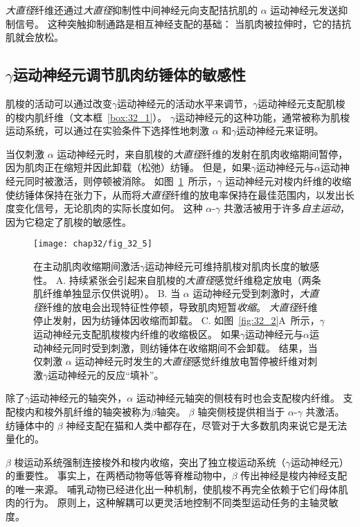 \textit{大直径}纤维还通过\textit{大直径}抑制性中间神经元向支配拮抗肌的 $ \alpha $ 运动神经元发送抑制信号。
这种突触抑制通路是相互神经支配的基础：
当肌肉被拉伸时，它的拮抗肌就会放松。



\subsection{$ \gamma $运动神经元调节肌肉纺锤体的敏感性}

肌梭的活动可以通过改变$ \gamma $运动神经元的活动水平来调节，$ \gamma $运动神经元支配肌梭的梭内肌纤维（文本框~\ref{box:32_1}）。
$ \gamma $运动神经元的这种功能，通常被称为肌梭运动系统，可以通过在实验条件下选择性地刺激 $ \alpha $ 和$ \gamma $运动神经元来证明。


当仅刺激 $ \alpha $ 运动神经元时，来自肌梭的\textit{大直径}纤维的发射在肌肉收缩期间暂停，因为肌肉正在缩短并因此卸载（松弛）纺锤。
但是，如果$ \gamma $运动神经元与$ \alpha $运动神经元同时被激活，则停顿被消除。
如图~\ref{fig:32_5}~所示，$ \gamma $ 运动神经元对梭内纤维的收缩使纺锤体保持在张力下，从而将\textit{大直径}纤维的放电率保持在最佳范围内，以发出长度变化信号，无论肌肉的实际长度如何。
这种 $ \alpha $-$ \gamma $ 共激活被用于许多\textit{自主运动}，因为它稳定了肌梭的敏感性。


\begin{figure}[htbp]
	\centering
	\texttt{[image: chap32/fig\_32\_5]}
	\caption{在主动肌肉收缩期间激活$ \gamma $运动神经元可维持肌梭对肌肉长度的敏感性\cite{hunt1951stretch}。
	A. 持续紧张会引起来自肌梭的\textit{大直径}感觉纤维稳定放电（两条肌纤维单独显示仅供说明）。
	B. 当 $ \alpha $ 运动神经元受到刺激时，\textit{大直径}纤维的放电会出现特征性停顿，导致肌肉短暂\textit{收缩}。
	\textit{大直径}纤维停止发射，因为纺锤体因收缩而卸载。
	C. 如图~\ref{fig:32_2}A~所示，$ \gamma $运动神经元支配肌梭梭内纤维的收缩极区。
	如果$ \gamma $运动神经元与$ \alpha $运动神经元同时受到刺激，则纺锤体在收缩期间不会卸载。
	结果，当仅刺激 $ \alpha $ 运动神经元时发生的\textit{大直径}感觉纤维放电暂停被纤维对刺激$ \gamma $运动神经元的反应“填补”。}
	\label{fig:32_5}
\end{figure}


除了$ \gamma $运动神经元的轴突外，$ \alpha $ 运动神经元轴突的侧枝有时也会支配梭内纤维。
支配梭内和梭外肌纤维的轴突被称为$\beta$轴突。
$ \beta $ 轴突侧枝提供相当于 $ \alpha $-$ \gamma $ 共激活。
纺锤体中的 $ \beta $ 神经支配在猫和人类中都存在，尽管对于大多数肌肉来说它是无法量化的。


$ \beta $ 梭运动系统强制连接梭外和梭内收缩，突出了独立梭运动系统（$ \gamma $运动神经元）的重要性。
事实上，在两栖动物等低等脊椎动物中，$ \beta $ 传出神经是梭内神经支配的唯一来源。
哺乳动物已经进化出一种机制，使肌梭不再完全依赖于它们母体肌肉的行为。
原则上，这种解耦可以更灵活地控制不同类型运动任务的主轴灵敏度。


